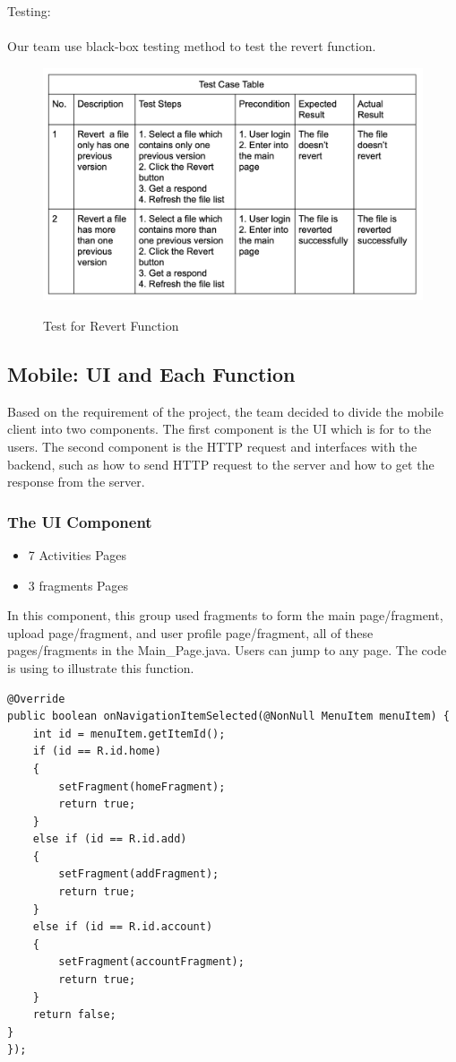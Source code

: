 \documentclass[11pt]{article}
\begin{document}
 Testing:
 \\
 \\
 Our team use black-box testing method to test the revert function.
\begin{figure}[htbp]
	\centering
	\includegraphics[width=12cm]{7.png}\\
	\caption{Test for Revert Function}
\end{figure}


\subsection{Mobile: UI and Each Function}
Based on the requirement of the project, the team decided to divide the mobile client into two components. The first component is the UI which is for to the users. The second component is the HTTP request and interfaces with the backend, such as how to send HTTP request to the server and how to get the response from the server.

\subsubsection{The UI Component}
\begin{itemize}
	\item 7 Activities Pages
	\item 3 fragments Pages
\end{itemize}

In this component, this group used fragments to form the main page/fragment, upload page/fragment, and user profile page/fragment, all of these pages/fragments in the Main\_Page.java. Users can jump to any page. The code is using to illustrate this function.

\begin{lstlisting}
@Override
public boolean onNavigationItemSelected(@NonNull MenuItem menuItem) {
	int id = menuItem.getItemId();
	if (id == R.id.home)
	{
		setFragment(homeFragment);
		return true;
	}
	else if (id == R.id.add)
	{
		setFragment(addFragment);
		return true;
	}
	else if (id == R.id.account)
	{
		setFragment(accountFragment);
		return true;
	}
	return false;
}
});
\end{lstlisting}
\end{document}
